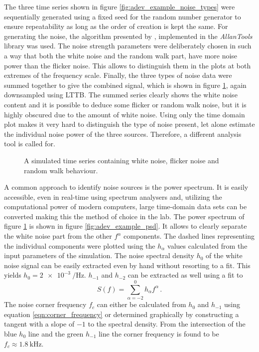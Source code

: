 The three time series shown in figure \ref{fig:adev_example_noise_types} were sequentially generated using a fixed seed for the random number generator to ensure repeatability as long as the order of creation is kept the same. For generating the noise, the algorithm presented by \citeauthor{noise_generation} \cite{noise_generation}, implemented in the \textit{AllanTools} library was used. The noise strength parameters were deliberately chosen in such a way that both the white noise and the random walk part, have more noise power than the flicker noise. This allows to distinguish them in the plots at both extremes of the frequency scale. Finally, the three types of noise data were summed together to give the combined signal, which is shown in figure \ref{fig:adev_example_time}, again downsampled using LTTB. The summed series clearly shows the white noise content and it is possible to deduce some flicker or random walk noise, but it is highly obscured due to the amount of white noise. Using only the time domain plot makes it very hard to distinguish the type of noise present, let alone estimate the individual noise power of the three sources. Therefore, a different analysis tool is called for.

\begin{figure}[ht]
    \centering
    
    \caption{A simulated time series containing white noise, flicker noise and random walk behaviour.}
    \label{fig:adev_example_time}
\end{figure}

A common approach to identify noise sources is the power spectrum. It is easily accessible, even in real-time using spectrum analysers and, utilizing the computational power of modern computers, large time-domain data sets can be converted making this the method of choice in the lab. The power spectrum of figure \ref{fig:adev_example_time} is shown in figure \ref{fig:adev_example_psd}. It allows to clearly separate the white noise part from the other $f^{\alpha}$ components. The dashed lines representing the individual components were plotted using the $h_\alpha$ values calculated from the input parameters of the simulation. The noise spectral density $h_0$ of the white noise signal can be easily extracted even by hand without resorting to a fit. This yields $h_{0} = \qty{2e-3}{\per \Hz} $. $h_{-1}$ and $h_{-2}$ can be extracted as well using a fit to
\begin{equation}
    S(f) = \sum_{\alpha = -2}^0 h_\alpha f^\alpha \, .
\end{equation}
The noise corner frequency $f_c$ can either be calculated from $h_0$ and $h_{-1}$ using equation \ref{eqn:corner_frequency} or determined graphically by constructing a tangent with a slope of $-1$ to the spectral density. From the intersection of the blue $h_0$ line and the green $h_{-1}$ line the corner frequency is found to be $f_c \approx \qty{1.8}{\kHz}$.

